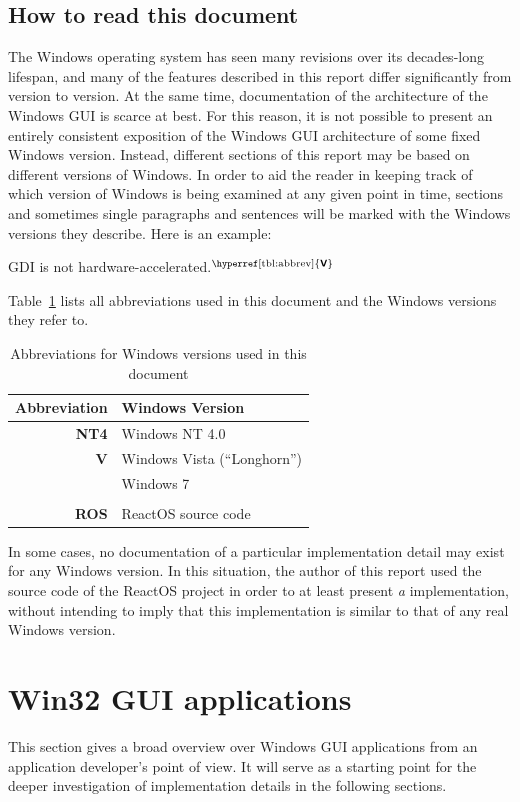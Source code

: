 \documentclass[10pt,twocolumn,a4paper]{article}
\newcommand{\bs}[1]{\textbf{\sffamily #1}}
\newcommand{\winver}[1]{$^{\text{\hyperref[tbl:abbrev]{\bs{#1}}}}$}
\begin{document}
		\subsection{How to read this document}
			The Windows operating system has seen many revisions over its
			decades-long lifespan, and many of the features described in this
			report differ significantly from version to version. At the same
			time, documentation of the architecture of the Windows GUI is
			scarce at best.  For this reason, it is not possible to present an
			entirely consistent exposition of the Windows GUI architecture of
			some fixed Windows version.  Instead, different sections of this
			report may be based on different versions of Windows. In order to
			aid the reader in keeping track of which version of Windows is
			being examined at any given point in time, sections and sometimes
			single paragraphs and sentences will be marked with the Windows
			versions they describe. Here is an example:

			\vspace{1em}
			GDI is not hardware-accelerated.\winver{V}
			\vspace{1em}

			Table~\ref{tbl:abbrev} lists all abbreviations used in this document
			and the Windows versions they refer to.

			\begin{table}[h]
				\centering
				\begin{tabular}{r|l}
					Abbreviation & Windows Version \\
					\hline
					\bs{NT4} & Windows NT 4.0 \\
					\bs{V} & Windows Vista (\enquote{Longhorn}) \\
					\bs{7} & Windows 7 \\
					\\
					\bs{ROS} & ReactOS source code
				\end{tabular}
				\caption{Abbreviations for Windows versions used in
					this document}
				\label{tbl:abbrev}
			\end{table}

			In some cases, no documentation of a particular implementation detail
			may exist for any Windows version. In this situation, the author of
			this report used the source code of the ReactOS project in order to
			at least present \emph{a} implementation, without intending to imply
			that this implementation is similar to that of any real Windows version.

	\section{Win32 GUI applications}
		This section gives a broad overview over Windows GUI applications from an
		application developer's point of view. It will serve as a starting point
		for the deeper investigation of implementation details in the following
		sections.
\end{document}
